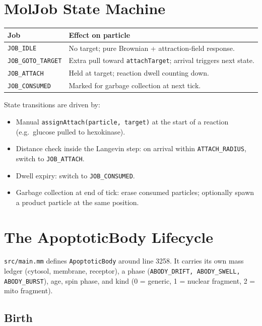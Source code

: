 \documentclass[11pt,letterpaper,twoside,openany]{book}
\newcommand{\code}[1]{\texttt{#1}}
\newcommand{\file}[1]{\texttt{\small#1}}
\begin{document}
\chapter{MolJob State Machine}
\label{ch:moljob}

\begin{longtable}{p{3.5cm}p{10.5cm}}
\toprule
\textbf{Job} & \textbf{Effect on particle}\\ \midrule
\code{JOB\_IDLE}         & No target; pure Brownian + attraction-field response.\\
\code{JOB\_GOTO\_TARGET} & Extra pull toward \code{attachTarget}; arrival triggers next state.\\
\code{JOB\_ATTACH}       & Held at target; reaction dwell counting down.\\
\code{JOB\_CONSUMED}     & Marked for garbage collection at next tick.\\
\bottomrule
\end{longtable}

State transitions are driven by:
\begin{itemize}
  \item Manual \code{assignAttach(particle, target)} at the start of
        a reaction (e.g.\ glucose pulled to hexokinase).
  \item Distance check inside the Langevin step: on arrival within
        \code{ATTACH\_RADIUS}, switch to \code{JOB\_ATTACH}.
  \item Dwell expiry: switch to \code{JOB\_CONSUMED}.
  \item Garbage collection at end of tick: erase consumed
        particles; optionally spawn a product particle at the same
        position.
\end{itemize}

\chapter{The ApoptoticBody Lifecycle}
\label{ch:apobody-deep}

\file{src/main.mm} defines \code{ApoptoticBody} around line 3258.
It carries its own mass ledger (cytosol, membrane, receptor), a
phase (\code{ABODY\_DRIFT, ABODY\_SWELL, ABODY\_BURST}), age, spin
phase, and kind (0 = generic, 1 = nuclear fragment, 2 = mito
fragment).

\section{Birth}
\end{document}
